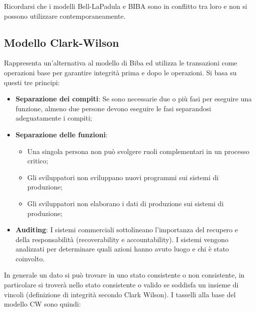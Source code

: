 Ricordarsi che i modelli Bell-LaPadula e BIBA sono in conflitto tra loro e
non si possono utilizzare
contemporaneamente.

\subsection{Modello Clark-Wilson}

Rappresenta un’alternativa al modello di Biba ed utilizza le transazioni come
operazioni base per
garantire integrità prima e dopo le operazioni.
Si basa su questi tre principi:

\begin{itemize}
      \item \textbf{Separazione dei compiti}: Se sono necessarie due o più fasi per
            eseguire una funzione,
            almeno due persone devono eseguire le fasi separandosi adeguatamente
            i compiti;
      \item \textbf{Separazione delle funzioni}:
            \begin{itemize}
                  \item Una singola persona non può svolgere ruoli complementari
                        in un processo critico;
                  \item Gli sviluppatori non sviluppano nuovi programmi sui
                        sistemi di produzione;
                  \item Gli sviluppatori non elaborano i dati di produzione sui
                        sistemi di produzione;
            \end{itemize}
      \item \textbf{Auditing}: I sistemi commerciali sottolineano l’importanza del
            recupero e della responsabilità
            (recoverability e accountability). I sistemi vengono analizzati per
            determinare quali azioni
            hanno avuto luogo e chi è stato coinvolto.
\end{itemize}

In generale un dato si può trovare in uno stato consistente o non consistente,
in particolare si
troverà nello stato consistente o valido se soddisfa un insieme di vincoli
(definizione di integrità
secondo Clark Wilson).
I tasselli alla base del modello CW sono quindi:

